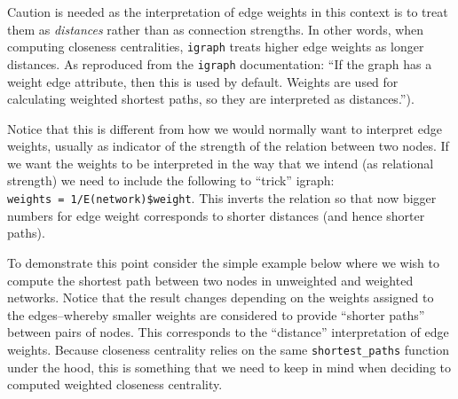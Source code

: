 \documentclass[
]{book}
\newenvironment{Shaded}{\begin{snugshade}}{\end{snugshade}}
\newcommand{\AttributeTok}[1]{\textcolor[rgb]{0.13,0.29,0.53}{#1}}
\newcommand{\CommentTok}[1]{\textcolor[rgb]{0.56,0.35,0.01}{\textit{#1}}}
\newcommand{\DecValTok}[1]{\textcolor[rgb]{0.00,0.00,0.81}{#1}}
\newcommand{\FunctionTok}[1]{\textcolor[rgb]{0.13,0.29,0.53}{\textbf{#1}}}
\newcommand{\NormalTok}[1]{#1}
\newcommand{\OtherTok}[1]{\textcolor[rgb]{0.56,0.35,0.01}{#1}}
\newcommand{\SpecialCharTok}[1]{\textcolor[rgb]{0.81,0.36,0.00}{\textbf{#1}}}
\begin{document}
Caution is needed as the interpretation of edge weights in this context is to treat them as \emph{distances} rather than as connection strengths. In other words, when computing closeness centralities, \texttt{igraph} treats higher edge weights as longer distances. As reproduced from the \texttt{igraph} documentation: ``If the graph has a weight edge attribute, then this is used by default. Weights are used for calculating weighted shortest paths, so they are interpreted as distances.'').

Notice that this is different from how we would normally want to interpret edge weights, usually as indicator of the strength of the relation between two nodes. If we want the weights to be interpreted in the way that we intend (as relational strength) we need to include the following to ``trick'' igraph: \texttt{weights\ =\ 1/E(network)\$weight}. This inverts the relation so that now bigger numbers for edge weight corresponds to shorter distances (and hence shorter paths).

To demonstrate this point consider the simple example below where we wish to compute the shortest path between two nodes in unweighted and weighted networks. Notice that the result changes depending on the weights assigned to the edges--whereby smaller weights are considered to provide ``shorter paths'' between pairs of nodes. This corresponds to the ``distance'' interpretation of edge weights. Because closeness centrality relies on the same \texttt{shortest\_paths} function under the hood, this is something that we need to keep in mind when deciding to computed weighted closeness centrality.

\begin{Shaded}
\end{Shaded}
\end{document}
